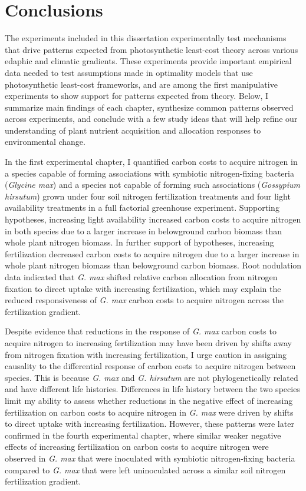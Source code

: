 \chapter{\textbf{Conclusions}}
\noindent The experiments included in this dissertation experimentally test mechanisms that drive patterns expected from photosynthetic least-cost theory across various edaphic and climatic gradients. These experiments provide important empirical data needed to test assumptions made in optimality models that use photosynthetic least-cost frameworks, and are among the first manipulative experiments to show support for patterns expected from theory. Below, I summarize main findings of each chapter, synthesize common patterns observed across experiments, and conclude with a few study ideas that will help refine our understanding of plant nutrient acquisition and allocation responses to environmental change.

In the first experimental chapter, I quantified carbon costs to acquire nitrogen in a species capable of forming associations with symbiotic nitrogen-fixing bacteria (\textit{Glycine max}) and a species not capable of forming such associations (\textit{Gossypium hirsutum}) grown under four soil nitrogen fertilization treatments and four light availability treatments in a full factorial greenhouse experiment. Supporting hypotheses, increasing light availability increased carbon costs to acquire nitrogen in both species due to a larger increase in belowground carbon biomass than whole plant nitrogen biomass. In further support of hypotheses, increasing fertilization decreased carbon costs to acquire nitrogen due to a larger increase in whole plant nitrogen biomass than belowground carbon biomass. Root nodulation data indicated that \textit{G. max} shifted relative carbon allocation from nitrogen fixation to direct uptake with increasing fertilization, which may explain the reduced responsiveness of \textit{G. max} carbon costs to acquire nitrogen across the fertilization gradient. 

Despite evidence that reductions in the response of \textit{G. max} carbon costs to acquire nitrogen to increasing fertilization may have been driven by shifts away from nitrogen fixation with increasing fertilization, I urge caution in assigning causality to the differential response of carbon costs to acquire nitrogen between species. This is because \textit{G. max} and \textit{G. hirsutum} are not phylogenetically related and have different life histories. Differences in life history between the two species limit my ability to assess whether reductions in the negative effect of increasing fertilization on carbon costs to acquire nitrogen in \textit{G. max} were driven by shifts to direct uptake with increasing fertilization. However, these patterns were later confirmed in the fourth experimental chapter, where similar weaker negative effects of increasing fertilization on carbon costs to acquire nitrogen were observed in \textit{G. max} that were inoculated with symbiotic nitrogen-fixing bacteria compared to \textit{G. max} that were left uninoculated across a similar soil nitrogen fertilization gradient.

